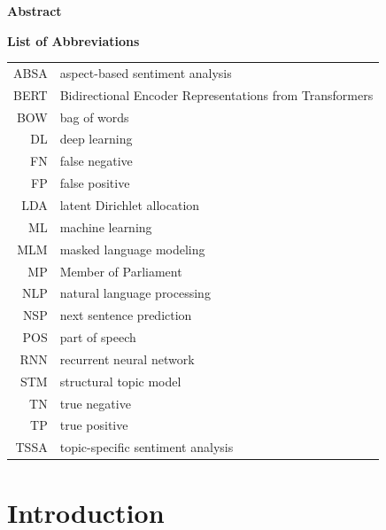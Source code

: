 \documentclass[12pt]{article}
\begin{document}

\newpage

\Large
\noindent
\textbf{Abstract}
\vspace{0.5cm} \\
\noindent
\normalsize

\newpage

\tableofcontents
\newpage

\Large
\noindent
\textbf{List of Abbreviations}
\vspace{0.5cm} \\
\noindent
\normalsize

\begin{tabular}{rl}
  ABSA & aspect-based sentiment analysis \\
  BERT & Bidirectional Encoder Representations from Transformers \\ 
  BOW & bag of words \\
  DL & deep learning \\
  FN & false negative \\
  FP & false positive \\
  LDA & latent Dirichlet allocation \\
  ML & machine learning \\
  MLM & masked language modeling \\
  MP & Member of Parliament \\
  NLP & natural language processing \\
  NSP & next sentence prediction \\
  POS & part of speech \\
  RNN & recurrent neural network \\
  STM & structural topic model \\
  TN & true negative \\
  TP & true positive \\
  TSSA & topic-specific sentiment analysis
\end{tabular}

\vspace{3cm}
\listoffigures
\vspace{3cm}
\listoftables

\newpage


    
\section{Introduction}
\label{intro}

\end{document}
